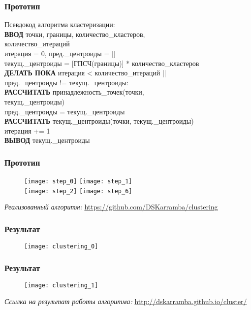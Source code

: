 \begin{frame} %
    \frametitle{Прототип}
    Псевдокод алгоритма кластеризации:\\
    \vspace{1em}
      \footnotesize
      \textbf{ВВОД} точки, границы, количество\_кластеров,\\
        \hspace{.15cm}количество\_итераций\\
      итерация = 0, пред.\_центроиды = []\\
      текущ.\_центроиды = [ГПСЧ(границы)] * количество\_кластеров\\
      \textbf{ДЕЛАТЬ ПОКА} итерация < количество\_итераций
        || \\ \hspace{.15cm} пред.\_центроиды != текущ.\_центроиды:\\
        \hspace{.5cm}\textbf{РАССЧИТАТЬ} принадлежность\_точек(точки,\\
          \hspace{.65cm} текущ.\_центроиды)\\
        \hspace{.5cm} пред.\_центроиды = текущ.\_центроиды\\
        \hspace{.5cm}\textbf{РАССЧИТАТЬ} текущ.\_центроиды(точки,
          текущ.\_центроиды)\\
        \hspace{.5cm} итерация += 1\\
      \textbf{ВЫВОД} текущ.\_центроиды
\end{frame}

\begin{frame} %
    \frametitle{Прототип}
    \begin{figure}
        \texttt{[image: step\_0]} \hfill
        \texttt{[image: step\_1]} \\
        \texttt{[image: step\_2]} \hfill
        \texttt{[image: step\_6]}
    \end{figure}
    \footnotesize\emph{Реализованный алгоритм:}
      \url{https://github.com/DSKarramba/clustering}\\
\end{frame}

\begin{frame} %
    \frametitle{Результат}
    \begin{figure}
        \center
        \texttt{[image: clustering\_0]}
    \end{figure}
    
    \vspace{5ex}
\end{frame}

\begin{frame} %
    \frametitle{Результат}
    \begin{figure}
        \center
        \texttt{[image: clustering\_1]}
    \end{figure}
    
    \footnotesize\emph{Ссылка на результат работы алгоритма:}
      \url{http://dskarramba.github.io/cluster/}
\end{frame}